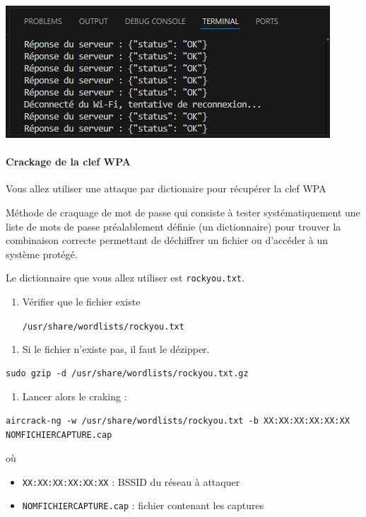 \documentclass[french, 12pt]{article}%
\newcommand{\itemE}{\item[$\bullet$]}
\newcommand{\titreencadre}{Titre}
\newenvironment{encadre}[1]{\renewcommand{\titreencadre}{#1}
	\begin{mdframed}[style=encadrestyle]
	\vspace{0.5\baselineskip}
	}{%
	\end{mdframed}}
\begin{document}
\begin{center}
\includegraphics[scale=0.7]{./ressource/moniteurVS}
\end{center}



\paragraph{Crackage de la clef WPA}
Vous allez utiliser une attaque par dictionaire pour récupérer la clef WPA

\begin{encadre}{Attaque par dictionnaire}
Méthode de craquage de mot de passe qui consiste à tester systématiquement une liste de mots de passe préalablement définie (un dictionnaire) pour trouver la combinaison correcte permettant de déchiffrer un fichier ou d'accéder à un système protégé.
\end{encadre}

Le dictionnaire que vous allez utiliser est \verb?rockyou.txt?.


\begin{enumerate}[resume]
\item Vérifier que le fichier existe 

\verb?/usr/share/wordlists/rockyou.txt?
\end{enumerate}


\begin{enumerate}[resume]
\item Si le fichier n'existe pas, il faut le dézipper.
\end{enumerate}

\begin{lstlisting}[style=commande]
sudo gzip -d /usr/share/wordlists/rockyou.txt.gz
\end{lstlisting}



\begin{enumerate}[resume]
\item Lancer alors le craking : 
\end{enumerate}
\begin{lstlisting}[style=commande]
aircrack-ng -w /usr/share/wordlists/rockyou.txt -b XX:XX:XX:XX:XX:XX NOMFICHIERCAPTURE.cap
\end{lstlisting}
où 
\begin{itemize}
\itemE \verb?XX:XX:XX:XX:XX:XX? : BSSID du réseau à attaquer
\itemE \verb?NOMFICHIERCAPTURE.cap?  : fichier contenant les captures
\end{itemize}
\end{document}
